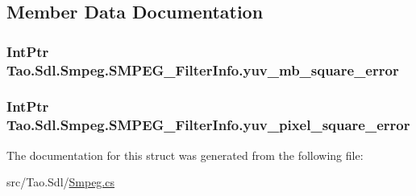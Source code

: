 \subsection{Member Data Documentation}
\hypertarget{struct_tao_1_1_sdl_1_1_smpeg_1_1_s_m_p_e_g___filter_info_a5263a9c2264eb157db7f6ef9039277ae}{
\subsubsection[{yuv\_\-mb\_\-square\_\-error}]{\setlength{\rightskip}{0pt plus 5cm}IntPtr {\bf Tao.Sdl.Smpeg.SMPEG\_\-FilterInfo.yuv\_\-mb\_\-square\_\-error}}}
\label{struct_tao_1_1_sdl_1_1_smpeg_1_1_s_m_p_e_g___filter_info_a5263a9c2264eb157db7f6ef9039277ae}
\hypertarget{struct_tao_1_1_sdl_1_1_smpeg_1_1_s_m_p_e_g___filter_info_aa3dadb3c2c02385ae034e63565e6d07e}{
\subsubsection[{yuv\_\-pixel\_\-square\_\-error}]{\setlength{\rightskip}{0pt plus 5cm}IntPtr {\bf Tao.Sdl.Smpeg.SMPEG\_\-FilterInfo.yuv\_\-pixel\_\-square\_\-error}}}
\label{struct_tao_1_1_sdl_1_1_smpeg_1_1_s_m_p_e_g___filter_info_aa3dadb3c2c02385ae034e63565e6d07e}


The documentation for this struct was generated from the following file:\begin{DoxyCompactItemize}
\item 
src/Tao.Sdl/\hyperlink{_smpeg_8cs}{Smpeg.cs}\end{DoxyCompactItemize}
